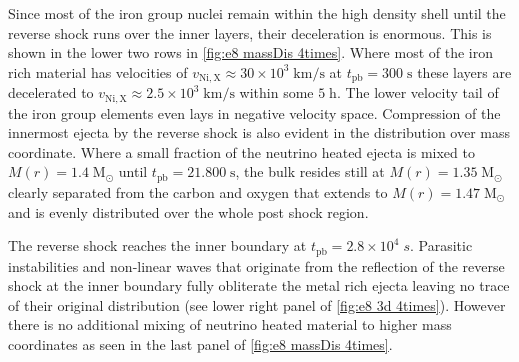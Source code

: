 \documentclass[fleqn,usenatbib]{mnras}
\newcommand{\tpb}{\ensuremath{t_{\text{pb}}}}
\renewcommand{\sec}{\xspace\ensuremath{\mathrm{s}}}
\begin{document}
Since most of the iron group nuclei remain within the high density shell until the reverse shock runs over the inner layers, their deceleration is enormous. This is shown in the lower two rows in \autoref{fig:e8 massDis 4times}. Where most of the iron rich material has velocities of $v_{\mathrm{Ni,X}}\approx 30\times10^3 \;\mathrm{km/s}$ at $t_{\mathrm{pb}}=300\;\mathrm{s}$ these layers are decelerated to $v_{\mathrm{Ni,X}}\approx 2.5\times 10^3\;\mathrm{km/s}$ within some $5 \;\mathrm{h}$. The lower velocity tail of the iron group elements even lays in negative velocity space. 
Compression of the innermost ejecta by the reverse shock is also evident in the distribution over mass coordinate. Where a small fraction of the neutrino heated ejecta is mixed to $M(r)=1.4\;\mathrm{M_{\odot}}$ until $t_{\mathrm{pb}}=21.800\;\sec$, the bulk resides still at  $M(r)=1.35\;\mathrm{M_{\odot}}$ clearly separated from the carbon and oxygen that extends to $M(r)=1.47\;\mathrm{M_{\odot}}$ and is evenly distributed over the whole post shock region.

The reverse shock reaches the inner boundary at $\tpb=2.8\times 10^4\;s$. Parasitic instabilities and non-linear waves that originate from the reflection of the reverse shock at the inner boundary fully obliterate the metal rich ejecta leaving no trace of their original distribution (see lower right panel of \autoref{fig:e8 3d 4times}). However there is no additional mixing of neutrino heated material to higher mass coordinates as seen in the last panel of \autoref{fig:e8 massDis 4times}.
\end{document}
